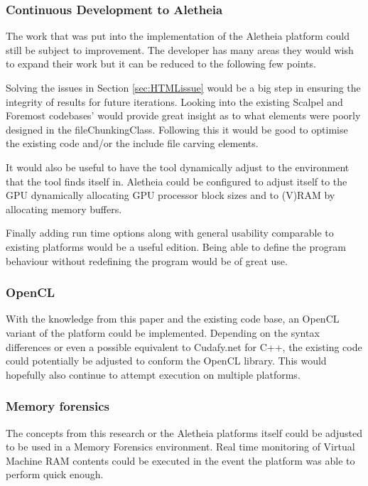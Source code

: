 \subsubsection*{Continuous Development to Aletheia}
The work that was put into the implementation of the Aletheia platform could still be subject to improvement.
The developer has many areas they would wish to expand their work but it can be reduced to the following few points.

Solving the issues in Section \ref{sec:HTMLissue} would be a big step in ensuring the integrity of results for future iterations.
Looking into the existing Scalpel and Foremost codebases' would provide great insight as to what elements were poorly designed in the fileChunkingClass.
Following this it would be good to optimise the existing code and/or the include file carving elements.

It would also be useful to have the tool dynamically adjust to the environment that the tool finds itself in.
Aletheia could be configured to adjust itself to the GPU dynamically allocating GPU processor block sizes and to (V)RAM by allocating memory buffers.

Finally adding run time options along with general usability comparable to existing platforms would be a useful edition.
Being able to define the program behaviour without redefining the program would be of great use.

\subsubsection*{OpenCL}
With the knowledge from this paper and the existing code base, an OpenCL variant of the platform could be implemented.
Depending on the syntax differences or even a possible equivalent to Cudafy.net for C++, the existing code could potentially be adjusted to conform the OpenCL library.
This would hopefully also continue to attempt execution on multiple platforms.

\subsubsection*{Memory forensics}
The concepts from this research or the Aletheia platforms itself could be adjusted to be used in a Memory Forensics environment.
Real time monitoring of Virtual Machine RAM contents could be executed in the event the platform was able to perform quick enough.
